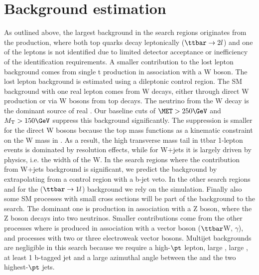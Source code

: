 \section{Background estimation}
\label{Sec:BkgEst}

As outlined above, the largest background in the search regions originates from the \ttbar production, where both top quarks decay leptonically ($\ttbar\rightarrow 2l$) and one of the leptons is not identified due to limited detector acceptance or inefficiency of the identification requirements. A smaller contribution to the lost lepton background comes from single t production in association with a W boson.  The lost lepton background is estimated using a dileptonic control region.  The SM background with one real lepton comes from W decays, either through direct W production or via W bosons from top decays.  The neutrino from the W decay is the dominant source of real \MET.  Our baseline cuts of $\MET>250 \GeV$ and $\MT>150 \GeV$ suppress this background significantly.    The suppression is smaller for the direct W bosons because the top mass functions as a kinematic constraint on the W mass in \ttbar. As a result, the high transverse mass tail in ttbar 1-lepton events is dominated by \MET resolution effects, while for W+jets it is largely driven by physics, i.e. the width of the W.   In the search regions where the contribution from W+jets background is significant, we predict the background by extrapolating from a control region with a b-jet veto.  In the other search regions and for the ($\ttbar\rightarrow 1l$) background we rely on the simulation.  Finally also some SM processes with small cross sections will be part of the background to the search.  The dominant one is \ttbar production in association with a Z boson, where the Z boson decays into two neutrinos.  Smaller contributions come from the other processes where \ttbar is produced in association with a vector boson ($\ttbar$W, \ttbar$\gamma$), and processes with two or three electroweak vector bosons. Multijet backgrounds are negligible in this search because we require a high-$\pt$ lepton, large \MET, large \MT, at least 1 b-tagged jet and a large azimuthal angle between the \MET and the two highest-$\pt$ jets.

